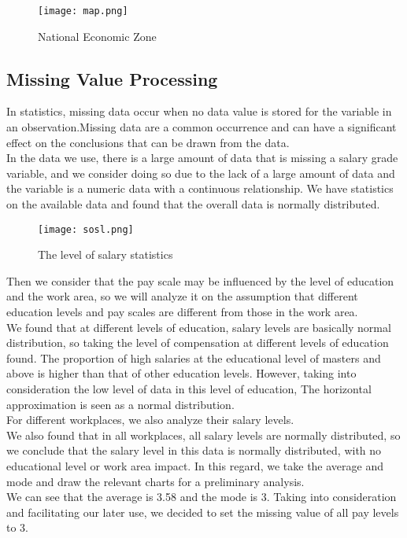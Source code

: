 \documentclass{mcmthesis}
\begin{document}
\begin{figure}[h]
\large
\centering
\texttt{[image: map.png]}
\caption{National Economic Zone} \label{fig:National Economic Zone}
\end{figure}

\subsection{Missing Value Processing}

In statistics, missing data occur when no data value is stored for the variable in an observation.Missing data are a common occurrence and can have a significant effect on the conclusions that can be drawn from the data.\\
\newline
In the data we use, there is a large amount of data that is missing a salary grade variable, and we consider doing so due to the lack of a large amount of data and the variable is a numeric data with a continuous relationship. We have statistics on the available data and found that the overall data is normally distributed.\\
\begin{figure}[h]
\small
\centering
\texttt{[image: sosl.png]}
\caption{The level of salary statistics} \label{fig:The level of salary statistics}
\end{figure}
\newline
Then we consider that the pay scale may be influenced by the level of education and the work area, so we will analyze it on the assumption that different education levels and pay scales are different from those in the work area.\\
We found that at different levels of education, salary levels are basically normal distribution, so taking the level of compensation at different levels of education found. The proportion of high salaries at the educational level of masters and above is higher than that of other education levels. However, taking into consideration the low level of data in this level of education, The horizontal approximation is seen as a normal distribution.\\
\newline
For different workplaces, we also analyze their salary levels.\\
We also found that in all workplaces, all salary levels are normally distributed, so we conclude that the salary level in this data is normally distributed, with no educational level or work area impact.
\newline
In this regard, we take the average and mode and draw the relevant charts for a preliminary analysis.\\
We can see that the average is 3.58 and the mode is 3. Taking into consideration and facilitating our later use, we decided to set the missing value of all pay levels to 3.\\
\end{document}
